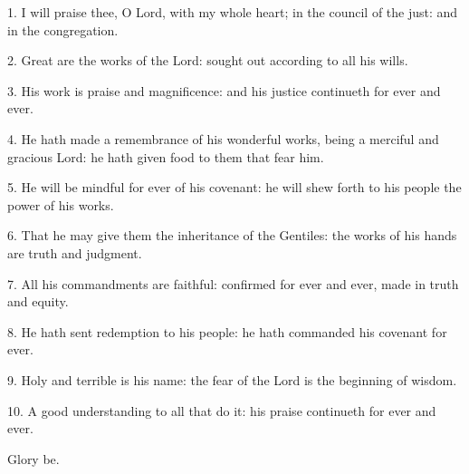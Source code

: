  1. I will praise thee, O Lord, with my whole heart; in the council of the just: and in the congregation.
 
 2. Great are the works of the Lord: sought out according to all his wills.
 
 3. His work is praise and magnificence: and his justice continueth for ever and ever.
 
 4.  He hath made a remembrance of his wonderful works, being a merciful and gracious Lord: he hath given food to them that fear him. 	
 
 5. He will be mindful for ever of his covenant: he will shew forth to his people the power of his works.
 
 6. That he may give them the inheritance of the Gentiles: the works of his hands are truth and judgment.
 
 7. All his commandments are faithful: confirmed for ever and ever, made in truth and equity.
 
 8. He hath sent redemption to his people: he hath commanded his covenant for ever.
 
 9. Holy and terrible is his name: the fear of the Lord is the beginning of wisdom.
 
 10. A good understanding to all that do it: his praise continueth for ever and ever. 
 
Glory be.